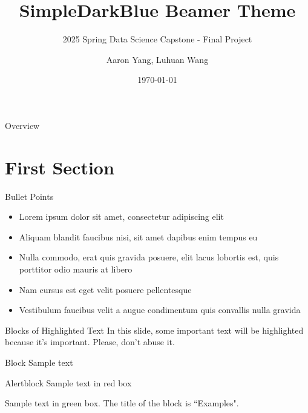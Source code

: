\documentclass[aspectratio=169,xcolor=dvipsnames]{beamer}
\title{SimpleDarkBlue Beamer Theme}
\subtitle{2025 Spring Data Science Capstone - Final Project}
\author{Aaron Yang, Luhuan Wang}
\institute
{
    Columbia College of Arts and Science \\
    George Washington University %
}
\date{\today} %
\begin{document}
\begin{frame}
    \titlepage
\end{frame}

\begin{frame}{Overview}
    \tableofcontents
\end{frame}

\section{First Section}

\begin{frame}{Bullet Points}
    \begin{itemize}
        \item Lorem ipsum dolor sit amet, consectetur adipiscing elit
        \item Aliquam blandit faucibus nisi, sit amet dapibus enim tempus eu
        \item Nulla commodo, erat quis gravida posuere, elit lacus lobortis est, quis porttitor odio mauris at libero
        \item Nam cursus est eget velit posuere pellentesque
        \item Vestibulum faucibus velit a augue condimentum quis convallis nulla gravida
    \end{itemize}
\end{frame}


\begin{frame}{Blocks of Highlighted Text}
    In this slide, some important text will be \alert{highlighted} because it's important. Please, don't abuse it.

    \begin{block}{Block}
        Sample text
    \end{block}

    \begin{alertblock}{Alertblock}
        Sample text in red box
    \end{alertblock}

    \begin{examples}
        Sample text in green box. The title of the block is ``Examples".
    \end{examples}
\end{frame}
\end{document}
